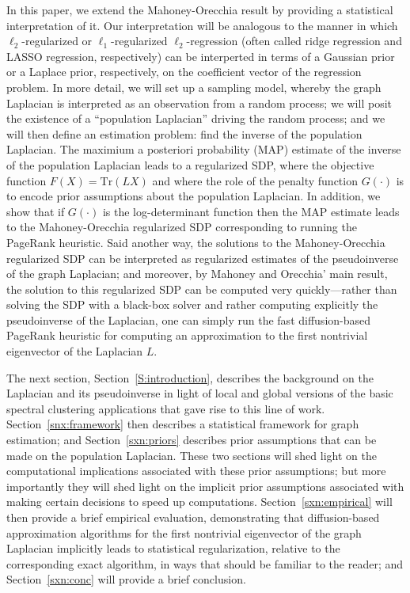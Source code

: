 \documentclass[12pt]{article}
\theoremstyle{plain}
\begin{document}
In this paper, we extend the Mahoney-Orecchia result by providing a
statistical interpretation of it.
Our interpretation will be analogous to the manner in which
$\ell_2$-regularized or $\ell_1$-regularized $\ell_2$-regression (often
called ridge regression and LASSO regression, respectively) can be
interperted in terms of a Gaussian prior or a Laplace prior, respectively,
on the coefficient vector of the regression problem.
In more detail, we will set up a sampling model, whereby the graph Laplacian
is interpreted as an observation from a random process; we will posit the
existence of a ``population Laplacian'' driving the random process; and we
will then define an estimation problem: find the inverse of the population
Laplacian.
The maximium a posteriori probability (MAP) estimate of the inverse of the
population Laplacian leads to a regularized SDP, where the objective
function $F(X)=\mathrm{Tr}(L X)$ and where the role of the penalty function
$G(\cdot)$ is to encode prior assumptions about the population Laplacian.
In addition, we show that if $G(\cdot)$ is the log-determinant function then
the MAP estimate leads to the Mahoney-Orecchia regularized SDP 
corresponding to running the PageRank heuristic.
Said another way, the solutions to the Mahoney-Orecchia regularized SDP can 
be interpreted as regularized estimates of the pseudoinverse of the graph 
Laplacian; and moreover, by Mahoney and Orecchia' main result, the solution 
to this regularized SDP can be computed very quickly---rather than solving 
the SDP with a black-box solver and rather computing explicitly the 
pseudoinverse of the Laplacian, one can simply run the fast diffusion-based 
PageRank heuristic for computing an approximation to the first nontrivial 
eigenvector of the Laplacian $L$.

The next section, Section~\ref{S:introduction}, describes the background on
the Laplacian and its pseudoinverse in light of local and global versions of
the basic spectral clustering applications that gave rise to this line of
work.
Section~\ref{snx:framework} then describes a statistical framework for graph
estimation; and Section~\ref{sxn:priors} describes prior assumptions that
can be made on the population Laplacian.
These two sections will shed light on the computational implications
associated with these prior assumptions; but more importantly they will shed
light on the implicit prior assumptions associated with making certain
decisions to speed up computations.
Section~\ref{sxn:empirical} will then provide a brief empirical evaluation,
demonstrating that diffusion-based approximation algorithms for the first 
nontrivial eigenvector of the graph Laplacian implicitly leads to 
statistical regularization, relative to the corresponding exact algorithm, 
in ways that should be familiar to the reader; and Section~\ref{sxn:conc} 
will provide a brief conclusion.
\end{document}
